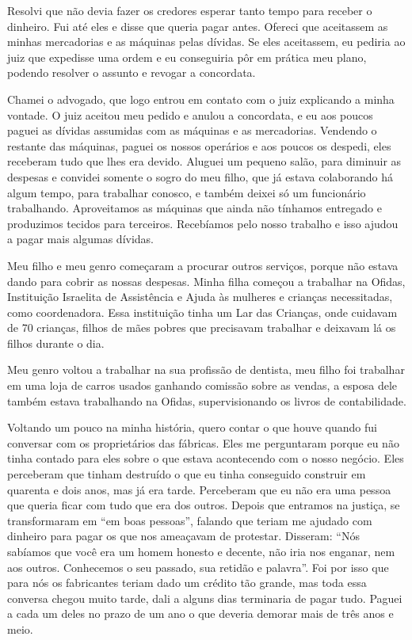 Resolvi que não devia fazer os credores esperar tanto tempo para receber
o dinheiro. Fui até eles e disse que queria pagar antes. Ofereci que
aceitassem as minhas mercadorias e as máquinas pelas dívidas. Se eles
aceitassem, eu pediria ao juiz que expedisse uma ordem e eu conseguiria
pôr em prática meu plano, podendo resolver o assunto e revogar a
concordata.

Chamei o advogado, que logo entrou em contato com o juiz explicando a
minha vontade. O juiz aceitou meu pedido e anulou a concordata, e eu aos
poucos paguei as dívidas assumidas com as máquinas e as mercadorias.
Vendendo o restante das máquinas, paguei os nossos operários e aos
poucos os despedi, eles receberam tudo que lhes era devido. Aluguei um
pequeno salão, para diminuir as despesas e convidei somente o sogro do
meu filho, que já estava colaborando há algum tempo, para trabalhar
conosco, e também deixei só um funcionário trabalhando. Aproveitamos as
máquinas que ainda não tínhamos entregado e produzimos tecidos para
terceiros. Recebíamos pelo nosso trabalho e isso ajudou a pagar mais
algumas dívidas.

Meu filho e meu genro começaram a procurar outros serviços, porque não
estava dando para cobrir as nossas despesas. Minha filha começou a
trabalhar na Ofidas, Instituição Israelita de Assistência e Ajuda às
mulheres e crianças necessitadas, como coordenadora. Essa instituição
tinha um Lar das Crianças, onde cuidavam de 70 crianças, filhos de mães
pobres que precisavam trabalhar e deixavam lá os filhos durante o dia.

Meu genro voltou a trabalhar na sua profissão de dentista, meu filho foi
trabalhar em uma loja de carros usados ganhando comissão sobre as
vendas, a esposa dele também estava trabalhando na Ofidas,
supervisionando os livros de contabilidade.

Voltando um pouco na minha história, quero contar o que houve quando fui
conversar com os proprietários das fábricas. Eles me perguntaram porque
eu não tinha contado para eles sobre o que estava acontecendo com o
nosso negócio. Eles perceberam que tinham destruído o que eu tinha
conseguido construir em quarenta e dois anos, mas já era tarde.
Perceberam que eu não era uma pessoa que queria ficar com tudo que era
dos outros. Depois que entramos na justiça, se transformaram em ``em
boas pessoas'', falando que teriam me ajudado com dinheiro para pagar os
que nos ameaçavam de protestar. Disseram: ``Nós sabíamos que você era um
homem honesto e decente, não iria nos enganar, nem aos outros.
Conhecemos o seu passado, sua retidão e palavra''. Foi por isso que para
nós os fabricantes teriam dado um crédito tão grande, mas toda essa
conversa chegou muito tarde, dali a alguns dias terminaria de pagar
tudo. Paguei a cada um deles no prazo de um ano o que deveria demorar
mais de três anos e meio.

